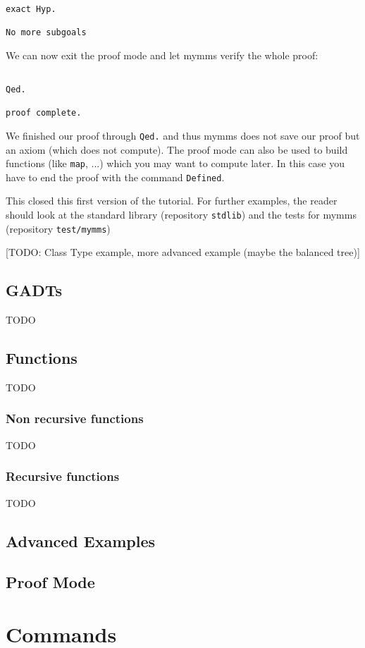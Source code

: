 \documentclass[a4paper,5pt,onecolumn]{article}
\begin{document}
\begin{verbatim}

exact Hyp.

No more subgoals

\end{verbatim}

We can now exit the proof mode and let mymms verify the whole proof:

\begin{verbatim}

Qed.

proof complete.

\end{verbatim}

We finished our proof through \texttt{Qed.} and thus mymms does not
save our proof but an axiom (which does not compute). The proof mode
can also be used to build functions (like \texttt{map}, ...)  which
you may want to compute later. In this case you have to end the proof
with the command \texttt{Defined}.

This closed this first version of the tutorial. For further examples,
the reader should look at the standard library (repository
\texttt{stdlib}) and the tests for mymms (repository
\texttt{test/mymms})

[TODO: Class Type example, more advanced example (maybe the balanced
  tree)]

\subsection{GADTs}

TODO

\subsection{Functions}

TODO

\subsubsection{Non recursive functions}

TODO

\subsubsection{Recursive functions}

TODO

\subsection{Advanced Examples}

\subsection{Proof Mode}

\section{Commands}
\end{document}
